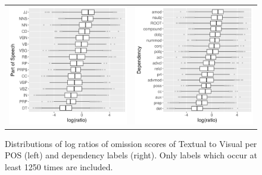 \begin{figure}[t]
  \centering
  \hspace*{-0.2in}
  \setlength{\tabcolsep}{0pt}
  \begin{tabular}{cc}
  \includegraphics[scale=0.55]{chapters/COLI/imaginet-omission-ratio-pos-boxplot.png} &
  \includegraphics[scale=0.55]{chapters/COLI/imaginet-omission-ratio-dep-boxplot.png} \\
  \end{tabular}
  \caption{Distributions of log ratios of omission scores of {\sc Textual} to {\sc Visual} per
    POS (left) and dependency labels (right). Only labels which occur at least 1250 times are included.}
\label{fig:omission-imaginet-ratio}
\end{figure}



